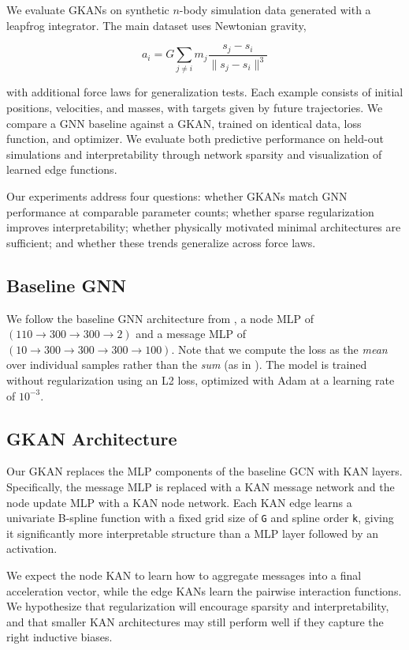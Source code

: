 \documentclass{article}
\begin{document}
We evaluate GKANs on synthetic $n$-body simulation data generated with a leapfrog integrator. The main dataset uses Newtonian gravity,

\[
a_{i} = G \sum_{j \neq i} m_{j} \frac{s_{j} - s_{i}}{\|s_{j} - s_{i}\|^{3}}
\]

with additional force laws for generalization tests. Each example consists of initial positions, velocities, and masses, with targets given by future trajectories. We compare a GNN baseline against a GKAN, trained on identical data, loss function, and optimizer. We evaluate both predictive performance on held-out simulations and interpretability through network sparsity and visualization of learned edge functions.

Our experiments address four questions: whether GKANs match GNN performance at comparable parameter counts; whether sparse regularization improves interpretability; whether physically motivated minimal architectures are sufficient; and whether these trends generalize across force laws.

\subsection{Baseline GNN}

We follow the baseline GNN architecture from \cite{cranmer2020discoveringsymbolicmodelsdeep}, a node MLP of $(110 \to 300 \to 300 \to 2)$ and a message MLP of $(10 \to 300 \to 300 \to 300 \to 100)$. Note that we compute the loss as the \textit{mean} over individual samples rather than the \textit{sum} (as in \cite{cranmer2020discoveringsymbolicmodelsdeep}). The model is trained without regularization using an L2 loss, optimized with Adam at a learning rate of $10^{-3}$.

\subsection{GKAN Architecture}

Our GKAN replaces the MLP components of the baseline GCN with KAN layers. Specifically, the message MLP is replaced with a KAN message network and the node update MLP with a KAN node network. Each KAN edge learns a univariate B-spline function with a fixed grid size of \texttt{G} and spline order \texttt{k}, giving it significantly more interpretable structure than a MLP layer followed by an activation.

We expect the node KAN to learn how to aggregate messages into a final acceleration vector, while the edge KANs learn the pairwise interaction functions. We hypothesize that regularization will encourage sparsity and interpretability, and that smaller KAN architectures may still perform well if they capture the right inductive biases.
\end{document}
